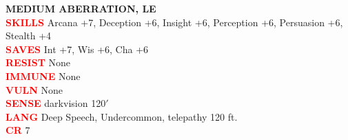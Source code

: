 \documentclass{article}
\begin{document}
\begin{adjustbox}{minipage=0.45\textwidth, margin=\fboxsep, bgimage=../images/texture2.pdf}
{\begin{minipage}[t][10.5in][t]{0.9\textwidth}
        \vspace{-0.08in}
        \begin{flushleft}
            {\large\textbf{MEDIUM ABERRATION, LE}}\\
            \textcolor{red}{\textbf{SKILLS}} Arcana +7, Deception +6, Insight +6, Perception +6, Persuasion +6, Stealth +4 \\
            \textcolor{red}{\textbf{SAVES}} Int +7, Wis +6, Cha +6 \\
            \textcolor{red}{\textbf{RESIST}} None\\
            \textcolor{red}{\textbf{IMMUNE}} None\\
            \textcolor{red}{\textbf{VULN}} None\\      
            \textcolor{red}{\textbf{SENSE}} darkvision 120$'$\\
            \textcolor{red}{\textbf{LANG}} Deep Speech, Undercommon, telepathy 120 ft.\\
            \textcolor{red}{\textbf{CR}}  7\\
        \end{flushleft}
        \end{minipage}
    }
\end{adjustbox}                     
\hspace{0.05\textwidth}
\end{document}
